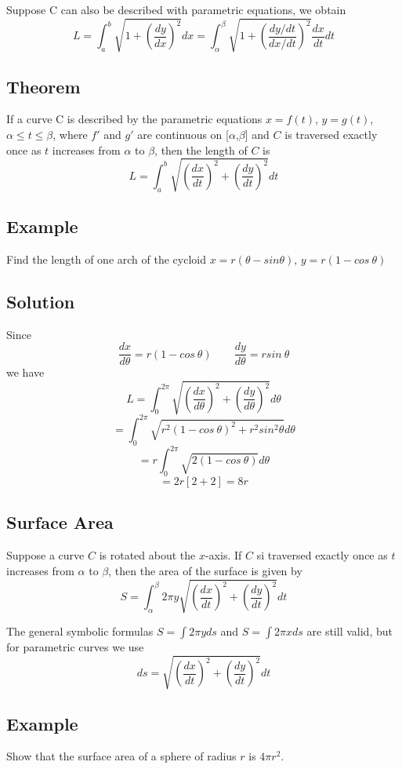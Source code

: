 Suppose C can also be described with parametric equations, we obtain
$$ L = \int_a^b \sqrt{1+\left(\frac{dy}{dx}\right)^2} dx = \int_\alpha^\beta \sqrt{1+(\frac{dy/dt}{dx/dt})^2}\frac{dx}{dt}dt $$

\subsection*{Theorem}
If a curve C is described by the parametric equations $x=f(t)$, $y=g(t)$,
$\alpha \leq t \leq \beta$, where $f'$ and $g'$ are continuous on [$\alpha$,$\beta$]
and $C$ is traversed exactly once as $t$ increases from $\alpha$ to $\beta$, then
the length of $C$ is
$$ L = \int_a^b \sqrt{\left(\frac{dx}{dt}\right)^2+\left(\frac{dy}{dt}\right)^2} dt $$

\subsection*{Example}
Find the length of one arch of the cycloid $x=r(\theta-sin\theta)$, $y=r(1-cos\:\theta)$

\subsection*{Solution}
Since
$$\frac{dx}{d\theta}=r(1-cos\:\theta) \qquad \frac{dy}{d\theta}=rsin\:\theta$$
we have
$$L=\int_0^{2\pi}\sqrt{\left(\frac{dx}{d\theta}\right)^2+\left(\frac{dy}{d\theta}\right)^2}d\theta$$
$$=\int_0^{2\pi}\sqrt{r^2(1-cos\:\theta)^2+r^2sin^2\theta}d\theta$$
$$=r\int_0^{2\pi}\sqrt{2(1-cos\:\theta)}d\theta$$
$$=2r[2+2]=8r$$

\subsection*{Surface Area}
Suppose a curve $C$ is rotated about the $x$-axis. If $C$ si traversed exactly
once as $t$ increases from $\alpha$ to $\beta$, then the area of the surface is given by
$$ S = \int_\alpha^\beta 2 \pi y \sqrt{\left(\frac{dx}{dt}\right)^2+\left(\frac{dy}{dt}\right)^2} dt $$

The general symbolic formulas $S=\int 2 \pi y ds$ and $S = \int 2 \pi x ds$
are still valid, but for parametric curves we use
$$ ds = \sqrt{\left(\frac{dx}{dt}\right)^2+\left(\frac{dy}{dt}\right)^2} dt $$

\subsection*{Example}
Show that the surface area of a sphere of radius $r$ is $4\pi r^2$.

